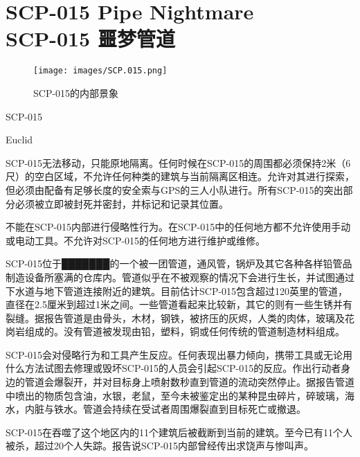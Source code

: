 \chapter[SCP-015 噩梦管道]{
    SCP-015 Pipe Nightmare\\
    SCP-015 噩梦管道
}

\label{chap:SCP-015}

\begin{figure}[H]
    \centering
    \texttt{[image: images/SCP.015.png]}
    \caption*{SCP-015的内部景象}
\end{figure}

SCP-015

Euclid

SCP-015无法移动，只能原地隔离。任何时候在SCP-015的周围都必须保持2米（6尺）的空白区域，不允许任何种类的建筑与当前隔离区相连。允许对其进行探索，但必须由配备有足够长度的安全索与GPS的三人小队进行。所有SCP-015的突出部分必须被立即被封死并密封，并标记和记录其位置。

不能在SCP-015内部进行侵略性行为。在SCP-015中的任何地方都不允许使用手动或电动工具。不允许对SCP-015的任何地方进行维护或维修。

SCP-015位于███████的一个被一团管道，通风管，锅炉及其它各种各样铅管品制造设备所塞满的仓库内。管道似乎在不被观察的情况下会进行生长，并试图通过下水道与地下管道连接附近的建筑。目前估计SCP-015包含超过120英里的管道，直径在2.5厘米到超过1米之间。一些管道看起来比较新，其它的则有一些生锈并有裂缝。据报告管道是由骨头，木材，钢铁，被挤压的灰烬，人类的肉体，玻璃及花岗岩组成的。没有管道被发现由铅，塑料，铜或任何传统的管道制造材料组成。

SCP-015会对侵略行为和工具产生反应。任何表现出暴力倾向，携带工具或无论用什么方法试图去修理或毁坏SCP-015的人员会引起SCP-015的反应。作出行动者身边的管道会爆裂开，并对目标身上喷射数秒直到管道的流动突然停止。据报告管道中喷出的物质包含油，水银，老鼠，至今未被鉴定出的某种昆虫碎片，碎玻璃，海水，内脏与铁水。管道会持续在受试者周围爆裂直到目标死亡或撤退。

SCP-015在吞噬了这个地区内的11个建筑后被截断到当前的建筑。至今已有11个人被杀，超过20个人失踪。报告说SCP-015内部曾经传出求饶声与惨叫声。
